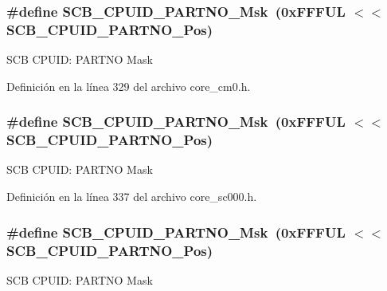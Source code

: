 \subsubsection[{\texorpdfstring{S\+C\+B\+\_\+\+C\+P\+U\+I\+D\+\_\+\+P\+A\+R\+T\+N\+O\+\_\+\+Msk}{SCB_CPUID_PARTNO_Msk}}]{\setlength{\rightskip}{0pt plus 5cm}\#define S\+C\+B\+\_\+\+C\+P\+U\+I\+D\+\_\+\+P\+A\+R\+T\+N\+O\+\_\+\+Msk~(0x\+F\+F\+F\+U\+L $<$$<$ S\+C\+B\+\_\+\+C\+P\+U\+I\+D\+\_\+\+P\+A\+R\+T\+N\+O\+\_\+\+Pos)}\hypertarget{group___c_m_s_i_s___s_c_b_ga98e581423ca016680c238c469aba546d}{}\label{group___c_m_s_i_s___s_c_b_ga98e581423ca016680c238c469aba546d}
S\+CB C\+P\+U\+ID\+: P\+A\+R\+T\+NO Mask 

Definición en la línea 329 del archivo core\+\_\+cm0.\+h.

\subsubsection[{\texorpdfstring{S\+C\+B\+\_\+\+C\+P\+U\+I\+D\+\_\+\+P\+A\+R\+T\+N\+O\+\_\+\+Msk}{SCB_CPUID_PARTNO_Msk}}]{\setlength{\rightskip}{0pt plus 5cm}\#define S\+C\+B\+\_\+\+C\+P\+U\+I\+D\+\_\+\+P\+A\+R\+T\+N\+O\+\_\+\+Msk~(0x\+F\+F\+F\+U\+L $<$$<$ S\+C\+B\+\_\+\+C\+P\+U\+I\+D\+\_\+\+P\+A\+R\+T\+N\+O\+\_\+\+Pos)}\hypertarget{group___c_m_s_i_s___s_c_b_ga98e581423ca016680c238c469aba546d}{}\label{group___c_m_s_i_s___s_c_b_ga98e581423ca016680c238c469aba546d}
S\+CB C\+P\+U\+ID\+: P\+A\+R\+T\+NO Mask 

Definición en la línea 337 del archivo core\+\_\+sc000.\+h.

\subsubsection[{\texorpdfstring{S\+C\+B\+\_\+\+C\+P\+U\+I\+D\+\_\+\+P\+A\+R\+T\+N\+O\+\_\+\+Msk}{SCB_CPUID_PARTNO_Msk}}]{\setlength{\rightskip}{0pt plus 5cm}\#define S\+C\+B\+\_\+\+C\+P\+U\+I\+D\+\_\+\+P\+A\+R\+T\+N\+O\+\_\+\+Msk~(0x\+F\+F\+F\+U\+L $<$$<$ S\+C\+B\+\_\+\+C\+P\+U\+I\+D\+\_\+\+P\+A\+R\+T\+N\+O\+\_\+\+Pos)}\hypertarget{group___c_m_s_i_s___s_c_b_ga98e581423ca016680c238c469aba546d}{}\label{group___c_m_s_i_s___s_c_b_ga98e581423ca016680c238c469aba546d}
S\+CB C\+P\+U\+ID\+: P\+A\+R\+T\+NO Mask 

